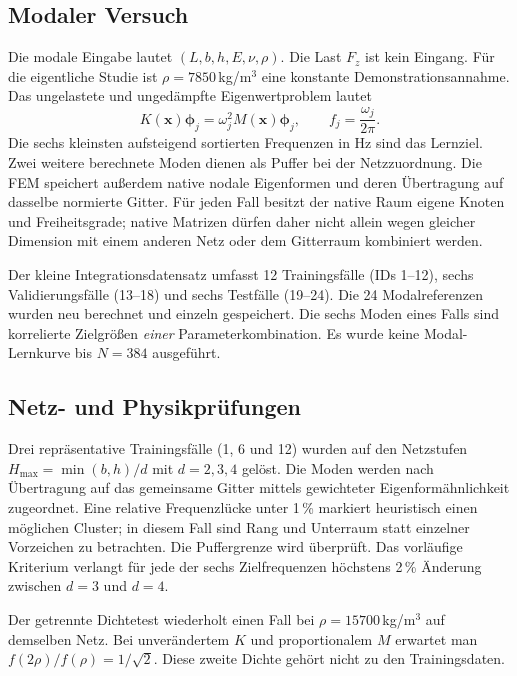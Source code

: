 \documentclass[11pt,a4paper]{article}
\begin{document}
\subsection{Modaler Versuch}
Die modale Eingabe lautet $(L,b,h,E,\nu,\rho)$. Die Last $F_z$ ist kein Eingang. Für die eigentliche Studie ist $\rho=7850$\,kg/m$^3$ eine konstante Demonstrationsannahme. Das ungelastete und ungedämpfte Eigenwertproblem lautet
\begin{equation}
 K(\boldsymbol x)\boldsymbol\phi_j=\omega_j^2M(\boldsymbol x)\boldsymbol\phi_j,
 \qquad f_j=\frac{\omega_j}{2\pi}.
\end{equation}
Die sechs kleinsten aufsteigend sortierten Frequenzen in Hz sind das Lernziel. Zwei weitere berechnete Moden dienen als Puffer bei der Netzzuordnung. Die FEM speichert außerdem native nodale Eigenformen und deren Übertragung auf dasselbe normierte Gitter. Für jeden Fall besitzt der native Raum eigene Knoten und Freiheitsgrade; native Matrizen dürfen daher nicht allein wegen gleicher Dimension mit einem anderen Netz oder dem Gitterraum kombiniert werden.

Der kleine Integrationsdatensatz umfasst 12 Trainingsfälle (IDs 1--12), sechs Validierungsfälle (13--18) und sechs Testfälle (19--24). Die 24 Modalreferenzen wurden neu berechnet und einzeln gespeichert. Die sechs Moden eines Falls sind korrelierte Zielgrößen \emph{einer} Parameterkombination. Es wurde keine Modal-Lernkurve bis $N=384$ ausgeführt.

\subsection{Netz- und Physikprüfungen}
Drei repräsentative Trainingsfälle (1, 6 und 12) wurden auf den Netzstufen $H_{\max}=\min(b,h)/d$ mit $d=2,3,4$ gelöst. Die Moden werden nach Übertragung auf das gemeinsame Gitter mittels gewichteter Eigenformähnlichkeit zugeordnet. Eine relative Frequenzlücke unter 1\,\% markiert heuristisch einen möglichen Cluster; in diesem Fall sind Rang und Unterraum statt einzelner Vorzeichen zu betrachten. Die Puffergrenze wird überprüft. Das vorläufige Kriterium verlangt für jede der sechs Zielfrequenzen höchstens 2\,\% Änderung zwischen $d=3$ und $d=4$.

Der getrennte Dichtetest wiederholt einen Fall bei $\rho=15700$\,kg/m$^3$ auf demselben Netz. Bei unverändertem $K$ und proportionalem $M$ erwartet man $f(2\rho)/f(\rho)=1/\sqrt2$. Diese zweite Dichte gehört nicht zu den Trainingsdaten.
\end{document}
